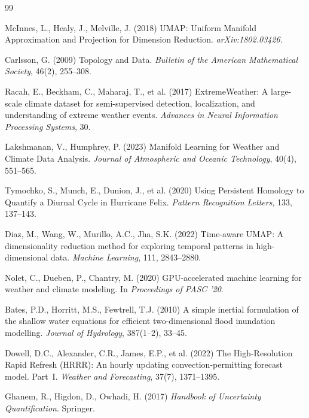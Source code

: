 \documentclass{article}
\begin{document}
\clearpage
\begin{thebibliography}{99}

 McInnes, L., Healy, J., Melville, J. (2018)
    UMAP: Uniform Manifold Approximation and Projection for Dimension Reduction.
    \textit{arXiv:1802.03426}.

 Carlsson, G. (2009)
    Topology and Data. \textit{Bulletin of the American Mathematical Society},
    46(2), 255--308.

 Racah, E., Beckham, C., Maharaj, T., et al. (2017)
    ExtremeWeather: A large-scale climate dataset for semi-supervised detection,
    localization, and understanding of extreme weather events.
    \textit{Advances in Neural Information Processing Systems}, 30.

 Lakshmanan, V., Humphrey, P. (2023)
    Manifold Learning for Weather and Climate Data Analysis.
    \textit{Journal of Atmospheric and Oceanic Technology}, 40(4), 551--565.

 Tymochko, S., Munch, E., Dunion, J., et al. (2020)
    Using Persistent Homology to Quantify a Diurnal Cycle in Hurricane Felix.
    \textit{Pattern Recognition Letters}, 133, 137--143.

 Diaz, M., Wang, W., Murillo, A.C., Jha, S.K. (2022)
    Time-aware UMAP: A dimensionality reduction method for exploring temporal
    patterns in high-dimensional data. \textit{Machine Learning}, 111, 2843--2880.

 Nolet, C., Dueben, P., Chantry, M. (2020)
    GPU-accelerated machine learning for weather and climate modeling.
    In \textit{Proceedings of PASC '20}.

 Bates, P.D., Horritt, M.S., Fewtrell, T.J. (2010)
    A simple inertial formulation of the shallow water equations for efficient
    two-dimensional flood inundation modelling.
    \textit{Journal of Hydrology}, 387(1--2), 33--45.

 Dowell, D.C., Alexander, C.R., James, E.P., et al. (2022)
    The High-Resolution Rapid Refresh (HRRR): An hourly updating
    convection-permitting forecast model. Part~I.
    \textit{Weather and Forecasting}, 37(7), 1371--1395.

 Ghanem, R., Higdon, D., Owhadi, H. (2017)
    \textit{Handbook of Uncertainty Quantification}. Springer.


\end{thebibliography}
\end{document}
